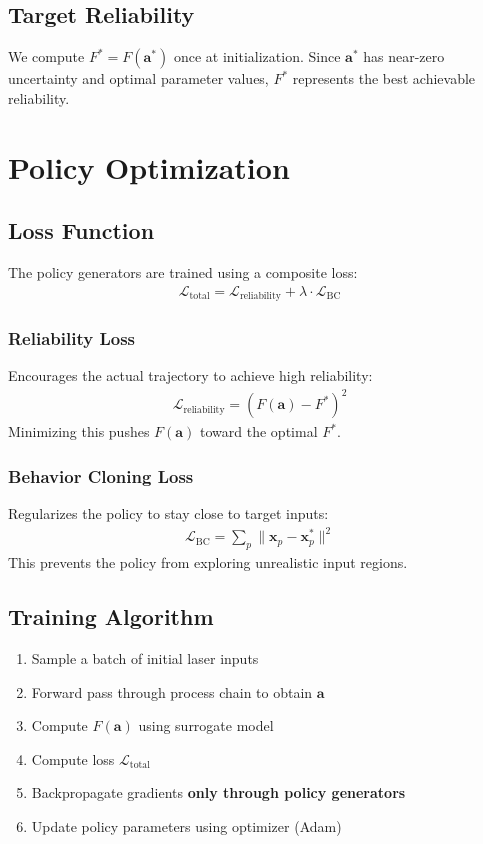 \documentclass[11pt,a4paper]{article}
\begin{document}
\subsection{Target Reliability}
We compute $F^* = F(\mathbf{a}^*)$ once at initialization. Since $\mathbf{a}^*$ has near-zero uncertainty and optimal parameter values, $F^*$ represents the best achievable reliability.

\section{Policy Optimization}

\subsection{Loss Function}
The policy generators are trained using a composite loss:
\begin{align}
\mathcal{L}_{\text{total}} = \mathcal{L}_{\text{reliability}} + \lambda \cdot \mathcal{L}_{\text{BC}}
\end{align}

\subsubsection{Reliability Loss}
Encourages the actual trajectory to achieve high reliability:
\begin{align}
\mathcal{L}_{\text{reliability}} = (F(\mathbf{a}) - F^*)^2
\end{align}
Minimizing this pushes $F(\mathbf{a})$ toward the optimal $F^*$.

\subsubsection{Behavior Cloning Loss}
Regularizes the policy to stay close to target inputs:
\begin{align}
\mathcal{L}_{\text{BC}} = \sum_{p} \|\mathbf{x}_p - \mathbf{x}_p^*\|^2
\end{align}
This prevents the policy from exploring unrealistic input regions.

\subsection{Training Algorithm}
\begin{enumerate}
    \item Sample a batch of initial laser inputs
    \item Forward pass through process chain to obtain $\mathbf{a}$
    \item Compute $F(\mathbf{a})$ using surrogate model
    \item Compute loss $\mathcal{L}_{\text{total}}$
    \item Backpropagate gradients \textbf{only through policy generators}
    \item Update policy parameters using optimizer (Adam)
\end{enumerate}
\end{document}
